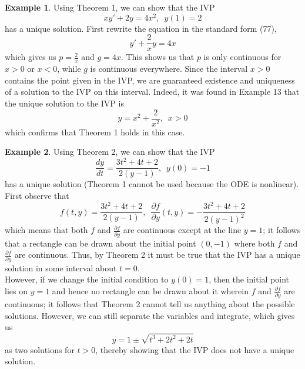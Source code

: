 \documentclass[11pt]{article}
\theoremstyle{definition}
\newtheorem{ex}{Example}
\begin{document}
\begin{ex}
    Using Theorem 1, we can show that the IVP \begin{equation}
        xy' + 2y = 4x^2,\,\,\,y(1) = 2
    \end{equation} has a unique solution. First rewrite the equation in the standard form (77), \begin{equation}
        y' + \frac{2}{x}y = 4x
    \end{equation} which gives us $p = \frac{2}{x}$ and $g = 4x$. This shows us that $p$ is only continuous for $x > 0$ or $x < 0$, while $g$ is continuous everywhere. Since the interval $x > 0$ contains the point given in the IVP, we are guaranteed existence and uniqueness of a solution to the IVP on this interval. Indeed, it was found in Example 13 that the unique solution to the IVP is \begin{equation}
        y = x^2 + \frac{2}{x^2},\,\,\,x > 0
    \end{equation} which confirms that Theorem 1 holds in this case.
\end{ex}\newpage
\begin{ex}
    Using Theorem 2, we can show that the IVP \begin{equation}
        \frac{dy}{dt} = \frac{3t^2 + 4t + 2}{2(y-1)},\,\,\,y(0) = -1
    \end{equation} has a unique solution (Theorem 1 cannot be used because the ODE is nonlinear). First observe that \begin{equation}
        f(t,y) = \frac{3t^2 + 4t + 2}{2(y-1)},\,\,\,\frac{\partial f}{\partial y}(t,y) = -\frac{3t^2 + 4t + 2}{2(y-1)^2}
    \end{equation} which means that both $f$ and $\frac{\partial f}{\partial y}$ are continuous except at the line $y = 1$; it follows that a rectangle can be drawn about the initial point $(0, -1)$ where both $f$ and $\frac{\partial f}{\partial y}$ are continuous. Thus, by Theorem 2 it must be true that the IVP has a unique solution in some interval about $t = 0$. \\
    However, if we change the initial condition to $y(0) = 1$, then the initial point lies on $y = 1$ and hence no rectangle can be drawn about it wherein $f$ and $\frac{\partial f}{\partial y}$ are continuous; it follows that Theorem 2 cannot tell us anything about the possible solutions. However, we can still separate the variables and integrate, which gives us
    \begin{equation}
        y = 1 \pm \sqrt{t^3 + 2t^2 + 2t}
    \end{equation} as two solutions for $t > 0$, thereby showing that the IVP does not have a unique solution.
\end{ex}
\end{document}
